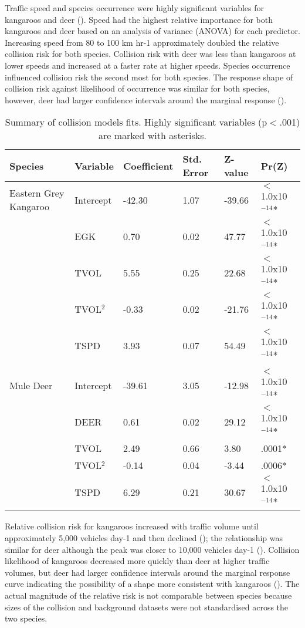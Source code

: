 Traffic speed and species occurrence were highly significant variables for kangaroos and deer (). Speed had the highest relative importance for both kangaroos and deer based on an analysis of variance (ANOVA) for each predictor. Increasing speed from 80 to 100 km hr-1 approximately doubled the relative collision risk for both species.  Collision risk with deer was less than kangaroos at lower speeds and increased at a faster rate at higher speeds. Species occurrence influenced collision risk the second most for both species.  The response shape of collision risk against likelihood of occurrence was similar for both species, however, deer had larger confidence intervals around the marginal response ().

\begin{table}[htp]
\caption[Summary of collision models for kangaroos and deer]{Summary of collision models fits.  Highly significant variables (p$<$.001) are marked with asterisks.}
\begin{tabularx}{\textwidth}{llllll} \toprule
Species					&Variable		&Coefficient	&Std. Error		&Z-value	&Pr(Z) \\ \midrule
Eastern Grey Kangaroo	&Intercept		&-42.30			&1.07			&-39.66		&$<$1.0x10$^{-14}$* \\
						&EGK			&0.70			&0.02			&47.77		&$<$1.0x10$^{-14}$* \\
						&TVOL			&5.55			&0.25			&22.68		&$<$1.0x10$^{-14}$* \\
						&TVOL$^2$		&-0.33			&0.02			&-21.76		&$<$1.0x10$^{-14}$* \\
						&TSPD			&3.93			&0.07			&54.49		&$<$1.0x10$^{-14}$* \\
&&&&& \\
Mule Deer				&Intercept		&-39.61			&3.05			&-12.98		&$<$1.0x10$^{-14}$* \\
						&DEER			&0.61			&0.02			&29.12		&$<$1.0x10$^{-14}$* \\
						&TVOL			&2.49			&0.66			&3.80		&.0001* \\
						&TVOL$^2$		&-0.14			&0.04			&-3.44		&.0006* \\
						&TSPD			&6.29			&0.21			&30.67		&$<$1.0x10$^{-14}$* \\
\bottomrule
\end{tabularx}
\label{cal_model_fits}
\end{table}

Relative collision risk  for kangaroos increased with traffic volume until approximately 5,000 vehicles day-1 and then declined (); the relationship was similar for deer although the peak was closer to 10,000 vehicles day-1 (). Collision likelihood of kangaroos decreased more quickly than deer at higher traffic volumes, but deer had larger confidence intervals around the marginal response curve indicating the possibility of a shape more consistent with kangaroos (). The actual magnitude of the relative risk is not comparable between species because sizes of the collision and background datasets were not standardised across the two species.

